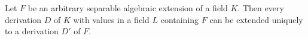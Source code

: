 Let $F$ be an arbitrary separable algebraic extension of a field $K$. Then every derivation $D$ of $K$ with values in a field $L$ containing $F$ can be extended uniquely to a derivation $D'$ of $F$.
